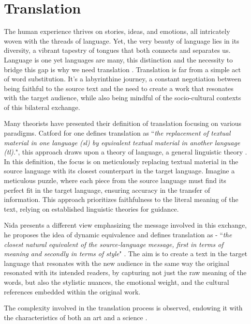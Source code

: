 \section{Translation}

 The human experience thrives on stories, ideas, and emotions, all intricately woven with the threads of language. Yet, the very beauty of language lies in its diversity, a vibrant tapestry of tongues that both connects and separates us. Language is one yet languages are many, this distinction and the necessity to bridge this gap is why we need translation \cite{ricoeur2007translation}. Translation is far from a simple act of word substitution. It's a labyrinthine journey, a constant negotiation between being faithful to the source text and the need to create a work that resonates with the target audience, while also being mindful of the socio-cultural contexts of this bilateral exchange.
 
Many theorists have presented their definition of translation focusing on various paradigms. Catford for one defines translation as ``{\itshape the replacement of textual material in one language (\gls{sl}) by equivalent textual material in another language (\gls{tl}).}", this approach draws upon a theory of language, a general linguistic theory \cite{catford1965linguistic}. In this definition, the focus is on meticulously replacing textual material in the source language with its closest counterpart in the target language. Imagine a meticulous puzzle, where each piece from the source language must find its perfect fit in the target language, ensuring accuracy in the transfer of information. This approach prioritizes faithfulness to the literal meaning of the text, relying on established linguistic theories for guidance.
 
 Nida presents a different view emphasizing the message involved in this exchange, he proposes the idea of dynamic equivalence and defines translation as - ``{\itshape the closest natural equivalent of the source-language message, first in terms of meaning and secondly in terms of style}" \cite{nida1964toward} \cite{jixing2013translation}. The aim is to create a text in the target language that resonates with the new audience in the same way the original resonated with its intended readers, by capturing not just the raw meaning of the words, but also the stylistic nuances, the emotional weight, and the cultural references embedded within the original work.

 The complexity involved in the translation process is observed, endowing it with the characteristics of both an art and a science \cite{nida1964toward} \cite{bell2016translation}.

